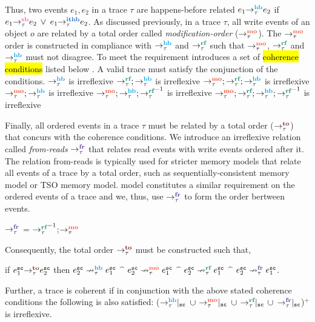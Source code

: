 Thus, two events $e_1,e_2$ in a trace $\tau$ are happens-before 
related \ie
$\hb{\tau}{e_1}{e_2}$ if $\seqb{\tau}{e_1}{e_2}$ $\vee$ 
$\ithb{\tau}{e_1}{e_2}$.
%
As discussed previously, in a trace $\tau$, all write events of 
an object $o$ are related by a total order called 
{\em modification-order} ($\setMO$).
%
The $\setMO$ order is constructed in compliance with $\setHB$ and 
$\setRF$ such that $\setMO$, $\setRF$ and $\setHB$ must not 
disagree.
%
To meet the requirement \cc introduces a set of
\hl{coherence conditions} listed below \cite{LahavVafeiadis-PLDI17}.
A valid \cc trace must satisfy the conjunction
of the conditions.
%
\newline $\setHB$ is irreflexive
\newline $\setRF;\setHB$ is irreflexive
\newline $\setMO;\setRF;\setHB$ is irreflexive
\newline $\setMO;\setHB$ is irreflexive
\newline $\setMO;\setHB;\setRF^{-1}$ is irreflexive
\newline $\setMO;\setRF;\setHB;\setRF^{-1}$ is irreflexive

Finally, all \sc ordered events in a trace $\tau$ must be related
by a total order ($\setTO$) that concurs with the coherence conditions.
%
We introduce an irreflexive relation called {\em from-reads} $\setFR$ 
that relates read events with write events ordered after it.
%
The relation from-reads is typically used for stricter memory models 
that relate all events of a trace by a total order,
such as sequentially-consistent memory model or TSO memory model.
\cc model constitutes a similar requirement on the \sc ordered
events of a trace and we, thus, use $\setFR$ to form the order
bertween \sc events.
%
\begin{definition}
	$\setFR$ = $\setRF^{-1}$;$\setMO$
\end{definition}
%
Consequently, the total order $\setTO$ must be constructed such that,

if 
$\to{\tau}{e^\sc_1}{e^\sc_2}$ then 
$\nhb{\tau}{e^\sc_2}{e^\sc_1}$ $\^$
$\nmo{\tau}{e^\sc_2}{e^\sc_1}$ $\^$
$\nrf{\tau}{e^\sc_2}{e^\sc_1}$ $\^$
$\nfr{\tau}{e^\sc_2}{e^\sc_1}$.

\noindent
Further, a trace is coherent if in conjunction with the
above stated coherence conditions the following is also satisfied: 
($\onsc{\setHB}$ $\cup$ $\onsc{\setMO}$ $\cup$ 
$\onsc{\setRF}$ $\cup$ $\onsc{\setFR}$)$^+$
is irreflexive.


